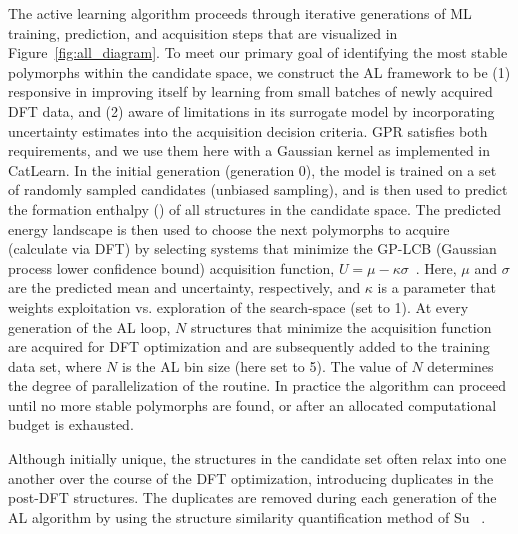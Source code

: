 %
%
The active learning algorithm proceeds through iterative generations of ML training, prediction, and acquisition steps that are visualized in Figure~\ref{fig:all_diagram}.
%
To meet our primary goal of identifying the most stable polymorphs within the candidate space,
we construct the AL framework to be
(1) responsive in improving itself by learning from small batches of newly acquired DFT data,
and (2) aware of limitations in its surrogate model by incorporating uncertainty estimates into the acquisition decision criteria.
%
GPR satisfies both requirements,
and we use them here with a Gaussian kernel as implemented in CatLearn.
\cite{hansen2019atomistic,CatLearn_Repo}
%
In the initial generation (generation 0), the model is trained on a set of randomly sampled candidates (unbiased sampling),
and is then used to predict the formation enthalpy (\DHf) of all structures in the candidate space.
%
The predicted energy landscape is then used to choose the next polymorphs to acquire (calculate via DFT) by selecting systems that minimize the GP-LCB (Gaussian process lower confidence bound) acquisition function,
$U = \mu - \kappa \sigma$~\cite{Cox1992}.
%
Here, $\mu$ and $\sigma$ are the predicted \DHf mean and uncertainty, respectively,
and $\kappa$ is a parameter that weights exploitation vs. exploration of the search-space (set to 1).
%
At every generation of the AL loop, $N$ structures that minimize the acquisition function are acquired for DFT optimization and are subsequently added to the training data set, where $N$ is the AL bin size (here set to 5).
%
The value of $N$ determines the degree of parallelization of the routine.
%
%
%
In practice the algorithm can proceed until no more stable polymorphs are found, or after an allocated computational budget is exhausted.


%
%
Although initially unique, the structures in the candidate set often relax into one another over the course of the DFT optimization, introducing duplicates in the post-DFT structures.
%
The duplicates are removed during each generation of the AL algorithm
by using the structure similarity quantification method of Su ~\cite{Su2017}.
%
